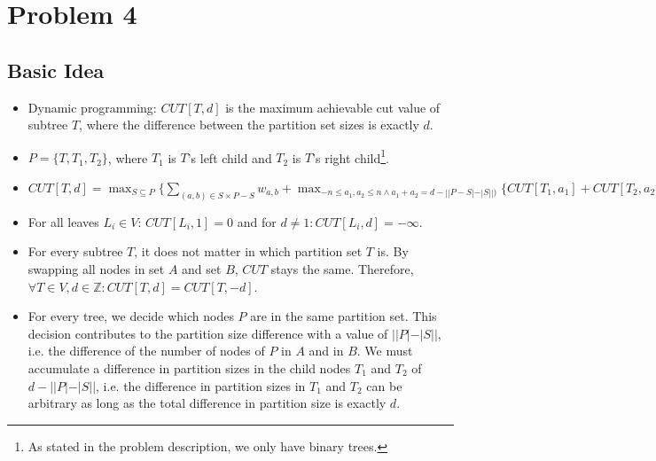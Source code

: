 \documentclass[12pt]{article}
\begin{document}
\section*{Problem 4}
\subsection*{Basic Idea}
\begin{itemize}
	\item Dynamic programming: $\mathit{CUT}[T, d]$ is the maximum achievable cut value of subtree $T$, where the difference between the partition set sizes is exactly $d$.
	\item $P = \{T, T_1, T_2\}$, where $T_1$ is $T$'s left child and $T_2$ is $T$'s right child\footnote{As stated in the problem description, we only have binary trees.}.
	\item $\mathit{CUT}[T, d] = \max_{S \subseteq P} \{ \sum_{(a,b) \in S \times P-S} w_{a,b} + \max_{-n \leq a_1, a_2 \leq n \wedge a_1 + a_2 = d - ||P-S| - |S||)} \{ \mathit{CUT}[T_1, a_1] + \mathit{CUT}[T_2, a_2] \} \}$
	\item For all leaves $L_i \in V$: $\mathit{CUT}[L_i,1] = 0$ and for $d \not= 1: \mathit{CUT}[L_i, d] = -\infty$.
	\item For every subtree $T$, it does not matter in which partition set $T$ is. By swapping all nodes in set $A$ and set $B$, $\mathit{CUT}$ stays the same. Therefore, $\forall T \in V, d \in \mathbb{Z}: \mathit{CUT}[T, d] = \mathit{CUT}[T, -d]$.
	\item For every tree, we decide which nodes $P$ are in the same partition set. This decision contributes to the partition size difference with a value of $||P| - |S||$, i.e. the difference of the number of nodes of $P$ in $A$ and in $B$. We must accumulate a difference in partition sizes in the child nodes $T_1$ and $T_2$ of $d-||P| - |S||$, i.e. the difference in partition sizes in $T_1$ and $T_2$ can be arbitrary as long as the total difference in partition size is exactly $d$.
\end{itemize}
\end{document}
